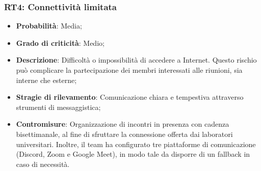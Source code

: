 \subsubsection{RT4: Connettività limitata}
\begin{itemize}
    \item \textbf{Probabilità}: Media;
    \item \textbf{Grado di criticità}: Medio;
    \item \textbf{Descrizione}: Difficoltà o impossibilità di accedere a Internet. Questo rischio può complicare la partecipazione dei membri interessati alle riunioni, sia interne che esterne;
    \item \textbf{Stragie di rilevamento}: Comunicazione chiara e tempestiva attraverso strumenti di messaggistica;
    \item \textbf{Contromisure}: Organizzazione di incontri in presenza con cadenza bisettimanale, al fine di sfruttare la connessione offerta dai laboratori universitari. Inoltre, il team ha configurato tre piattaforme di comunicazione (Discord, Zoom e Google Meet), in modo tale da disporre di un fallback in caso di necessità.
\end{itemize}
